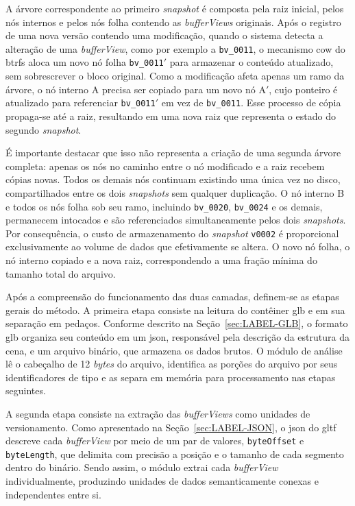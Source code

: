 A árvore correspondente ao primeiro \textit{snapshot} é composta pela raiz inicial,
pelos nós internos e pelos nós folha contendo as \textit{bufferViews} originais.
Após o registro de uma nova versão contendo uma modificação, quando o sistema
detecta a alteração de uma \textit{bufferView}, como por exemplo a
\texttt{bv\_0011}, o mecanismo \gls{cow} do \gls{btrfs} aloca um novo nó folha
\texttt{bv\_0011$'$} para armazenar o conteúdo atualizado, sem sobrescrever o bloco
original. Como a modificação afeta apenas um ramo da árvore, o nó interno A precisa
ser copiado para um novo nó A$'$, cujo ponteiro é atualizado para referenciar
\texttt{bv\_0011$'$} em vez de \texttt{bv\_0011}. Esse processo de cópia
propaga-se até a raiz, resultando em uma nova raiz que representa o estado do
segundo \textit{snapshot}.

É importante destacar que isso não representa a criação de uma segunda árvore
completa: apenas os nós no caminho entre o nó modificado e a raiz recebem cópias
novas. Todos os demais nós continuam existindo uma única vez no disco,
compartilhados entre os dois \textit{snapshots} sem qualquer duplicação. O nó
interno B e todos os nós folha sob seu ramo, incluindo \texttt{bv\_0020},
\texttt{bv\_0024} e os demais, permanecem intocados e são referenciados
simultaneamente pelos dois \textit{snapshots}. Por consequência, o custo de
armazenamento do \textit{snapshot} \texttt{v0002} é proporcional exclusivamente ao
volume de dados que efetivamente se altera. O novo nó folha, o nó interno copiado e
a nova raiz, correspondendo a uma fração mínima do tamanho total do arquivo.

Após a compreensão do funcionamento das duas camadas, definem-se as etapas gerais do
método. A primeira etapa consiste na leitura do contêiner \gls{glb} e em sua
separação em pedaços. Conforme descrito na Seção~\ref{sec:LABEL-GLB}, o formato
\gls{glb} organiza seu conteúdo em um \gls{json}, responsável pela descrição da
estrutura da cena, e um arquivo binário, que armazena os dados brutos. O módulo de
análise lê o cabeçalho de 12 \textit{bytes} do arquivo, identifica as porções do
arquivo por seus identificadores de tipo e as separa em memória para processamento
nas etapas seguintes.

A segunda etapa consiste na extração das \textit{bufferViews} como unidades de
versionamento. Como apresentado na Seção~\ref{sec:LABEL-JSON}, o \gls{json} do
\gls{gltf} descreve cada \textit{bufferView} por meio de um par de valores,
\texttt{byteOffset} e \texttt{byteLength}, que delimita com precisão a posição e o
tamanho de cada segmento dentro do binário. Sendo assim, o módulo extrai cada
\textit{bufferView} individualmente, produzindo unidades de dados semanticamente
conexas e independentes entre si.

